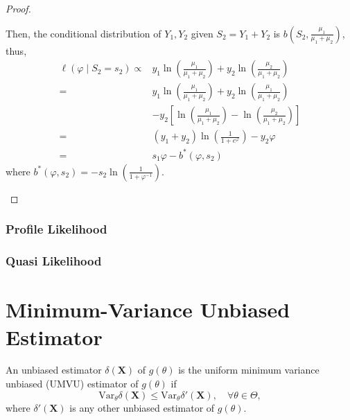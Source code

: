 \begin{proof}
\begin{enumerate}
              Then, the conditional distribution of $Y_{1},Y_{2}$ given $S_{2}=Y_{1}+Y_{2}$ is $b\left(S_{2},\frac{\mu_{1}}{\mu_{1}+\mu_{2}}\right)$, thus,
              \begin{equation*}
                  \begin{aligned}
                      \ell\left(\varphi\mid S_{2}=s_{2}\right)\propto & y_{1}\ln\left(\frac{\mu_{1}}{\mu_{1}+\mu_{2}}\right)+y_{2}\ln\left(\frac{\mu_{2}}{\mu_{1}+\mu_{2}}\right)          \\
                      =                                               & y_{1}\ln\left(\frac{\mu_{1}}{\mu_{1}+\mu_{2}}\right)+y_{2}\ln\left(\frac{\mu_{1}}{\mu_{1}+\mu_{2}}\right)          \\
                                                                      & -y_{2}\left[\ln\left(\frac{\mu_{1}}{\mu_{1}+\mu_{2}}\right)-\ln\left(\frac{\mu_{2}}{\mu_{1}+\mu_{2}}\right)\right] \\
                      =                                               & \left(y_{1}+y_{2}\right)\ln\left(\frac{1}{1+e^{\varphi}}\right)-y_{2}\varphi                                       \\
                      =                                               & s_{1}\varphi-b^{*}\left(\varphi,s_{2}\right)
                  \end{aligned}
              \end{equation*}
              where $b^{*}\left(\varphi,s_{2}\right)=-s_{2}\ln\left(\frac{1}{1+\varphi^{-1}}\right)$.
    \end{enumerate}
\end{proof}

\subsubsection{Profile Likelihood}

\subsubsection{Quasi Likelihood}

\section{Minimum-Variance Unbiased Estimator}

\begin{definition}
    An unbiased estimator $\delta(\textbf{X})$ of $g(\theta)$ is the uniform minimum variance unbiased (UMVU) estimator of $g(\theta)$ if
    \begin{equation}
        \text{Var}_{\theta}\delta(\textbf{X})\leq\text{Var}_{\theta}\delta'(\textbf{X}),\quad\forall\theta\in\Theta,
    \end{equation}
    where $\delta'(\textbf{X})$ is any other unbiased estimator of $g(\theta)$.
\end{definition}

